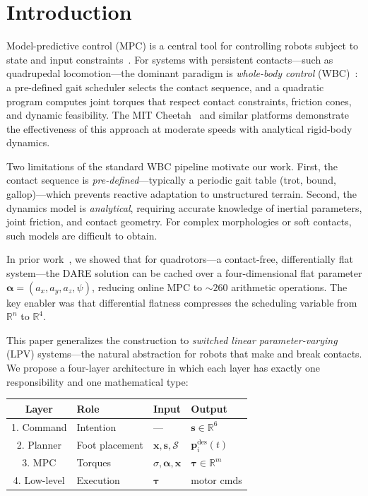 \documentclass[letterpaper, 10pt, conference]{IEEEtran}
\newcommand{\R}{\mathbb{R}}
\newcommand{\balpha}{\bm{\alpha}}
\newcommand{\bx}{\bm{x}}
\newcommand{\bp}{\bm{p}}
\newcommand{\cS}{\mathcal{S}}
\begin{document}
\section{Introduction}\label{sec:intro}

Model-predictive control (MPC) is a central tool for controlling
robots subject to state and input constraints~\cite{tinympc}.
For systems with persistent contacts---such as quadrupedal
locomotion---the dominant paradigm is \emph{whole-body control}
(WBC)~\cite{kim2019}: a pre-defined gait scheduler selects
the contact sequence, and a quadratic program computes joint
torques that respect contact constraints, friction cones,
and dynamic feasibility.
The MIT Cheetah~\cite{kim2019} and similar platforms demonstrate
the effectiveness of this approach at moderate speeds with
analytical rigid-body dynamics.

Two limitations of the standard WBC pipeline motivate our work.
First, the contact sequence is \emph{pre-defined}---typically
a periodic gait table (trot, bound, gallop)---which prevents
reactive adaptation to unstructured terrain.
Second, the dynamics model is \emph{analytical}, requiring
accurate knowledge of inertial parameters, joint friction,
and contact geometry.
For complex morphologies or soft contacts, such models are
difficult to obtain.

In prior work~\cite{zhang2025flat}, we showed that for quadrotors---a
contact-free, differentially flat system---the DARE solution
can be cached over a four-dimensional flat parameter
$\balpha = (a_x, a_y, a_z, \psi)$,
reducing online MPC to ${\sim}260$ arithmetic operations.
The key enabler was that differential flatness compresses the
scheduling variable from $\R^n$ to $\R^4$.

This paper generalizes the construction to \emph{switched
linear parameter-varying} (LPV) systems---the natural abstraction
for robots that make and break contacts.
We propose a four-layer architecture in which each layer has
exactly one responsibility and one mathematical type:

\begin{center}
\small
\begin{tabular}{@{}clp{1.6cm}p{2.2cm}@{}}
\toprule
Layer & Role & Input & Output \\
\midrule
1. Command & Intention & --- & $\bm{s} {\in} \R^6$ \\
2. Planner & Foot placement & $\bx, \bm{s}, \cS$ &
  $\bp^{\mathrm{des}}_i(t)$ \\
3. MPC & Torques & $\sigma, \balpha, \bx$ &
  $\bm{\tau} {\in} \R^m$ \\
4. Low-level & Execution & $\bm{\tau}$ & motor cmds \\
\bottomrule
\end{tabular}
\end{center}
\end{document}
